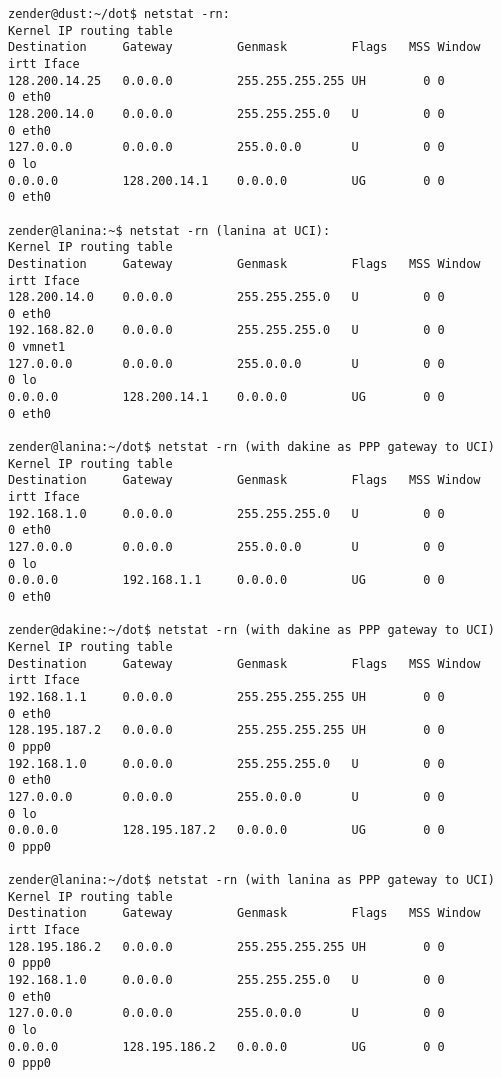 \documentclass[12pt,twoside]{article}
\begin{document}
\begin{verbatim}
zender@dust:~/dot$ netstat -rn:
Kernel IP routing table
Destination     Gateway         Genmask         Flags   MSS Window  irtt Iface
128.200.14.25   0.0.0.0         255.255.255.255 UH        0 0          0 eth0
128.200.14.0    0.0.0.0         255.255.255.0   U         0 0          0 eth0
127.0.0.0       0.0.0.0         255.0.0.0       U         0 0          0 lo
0.0.0.0         128.200.14.1    0.0.0.0         UG        0 0          0 eth0

zender@lanina:~$ netstat -rn (lanina at UCI):
Kernel IP routing table
Destination     Gateway         Genmask         Flags   MSS Window  irtt Iface
128.200.14.0    0.0.0.0         255.255.255.0   U         0 0          0 eth0
192.168.82.0    0.0.0.0         255.255.255.0   U         0 0          0 vmnet1
127.0.0.0       0.0.0.0         255.0.0.0       U         0 0          0 lo
0.0.0.0         128.200.14.1    0.0.0.0         UG        0 0          0 eth0

zender@lanina:~/dot$ netstat -rn (with dakine as PPP gateway to UCI)
Kernel IP routing table
Destination     Gateway         Genmask         Flags   MSS Window  irtt Iface
192.168.1.0     0.0.0.0         255.255.255.0   U         0 0          0 eth0
127.0.0.0       0.0.0.0         255.0.0.0       U         0 0          0 lo
0.0.0.0         192.168.1.1     0.0.0.0         UG        0 0          0 eth0

zender@dakine:~/dot$ netstat -rn (with dakine as PPP gateway to UCI)
Kernel IP routing table
Destination     Gateway         Genmask         Flags   MSS Window  irtt Iface
192.168.1.1     0.0.0.0         255.255.255.255 UH        0 0          0 eth0
128.195.187.2   0.0.0.0         255.255.255.255 UH        0 0          0 ppp0
192.168.1.0     0.0.0.0         255.255.255.0   U         0 0          0 eth0
127.0.0.0       0.0.0.0         255.0.0.0       U         0 0          0 lo
0.0.0.0         128.195.187.2   0.0.0.0         UG        0 0          0 ppp0   

zender@lanina:~/dot$ netstat -rn (with lanina as PPP gateway to UCI)
Kernel IP routing table
Destination     Gateway         Genmask         Flags   MSS Window  irtt Iface
128.195.186.2   0.0.0.0         255.255.255.255 UH        0 0          0 ppp0
192.168.1.0     0.0.0.0         255.255.255.0   U         0 0          0 eth0
127.0.0.0       0.0.0.0         255.0.0.0       U         0 0          0 lo
0.0.0.0         128.195.186.2   0.0.0.0         UG        0 0          0 ppp0


\end{verbatim}
\end{document}
